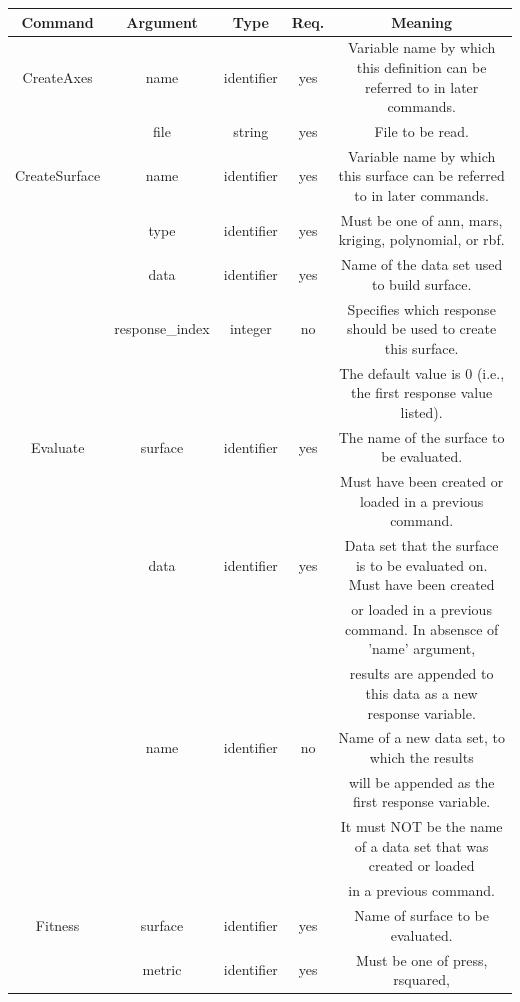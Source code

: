 \documentclass{article}
\begin{document}
\begin{table}
  \centering
  \begin{tabular}{|c|c|c|c|c|}
    \hline
    \textbf{Command} & \textbf{Argument} & \textbf{Type} &
    \textbf{Req.} & \textbf{Meaning}\\
    \hline
    CreateAxes & name & identifier & yes & Variable name by which
    this definition can be referred to in later commands.\\
    \hline
    & file & string & yes & File to be read.\\
    \hline
    CreateSurface & name & identifier & yes & Variable name by which
    this surface can be referred to in later commands.\\
    \hline
    & type & identifier & yes & Must be one of ann, mars, kriging, polynomial,
    or rbf.\\
    \hline
    & data & identifier & yes & Name of the data set used to
    build surface.\\
    \hline
    & response\_index & integer & no & Specifies which response
    should be used to create this surface.\\
    & & & & The default value is 0 (i.e., the first response value
    listed).\\
    \hline
    Evaluate & surface & identifier & yes & The name of the surface to
    be evaluated.\\
    & & & & Must have been created or loaded in a previous command.\\
    \hline
    & data & identifier & yes & Data set that the surface is to
    be evaluated on.  Must have been created  \\
    & & & & or loaded in a previous command.  In absensce of 'name' argument,\\
    & & & & results are appended to this data as a new response variable. \\
    \hline
    & name & identifier & no & Name of a new data set, to which the results\\
    & & & & will be appended as the first response variable. \\
    & & & & It must NOT be the name of a data set that was created or
    loaded\\
    & & & & in a previous command.\\
    \hline
    Fitness & surface & identifier & yes & Name of surface to be
    evaluated.\\
    \hline
    & metric & identifier & yes & Must be one of press, rsquared,

\end{tabular}
\end{table}
\end{document}
